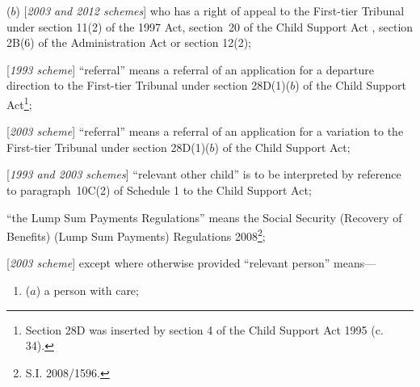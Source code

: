 \documentclass[12pt,a4paper]{article}
\begin{document}
\begin{enumerate}
\begin{enumerate}
($b$) [\emph{2003 and 2012 schemes}] who has a right of appeal to 
the First-tier Tribunal  %
under section 11(2) of the 1997 Act, section~20 of the Child Support Act%
, section 2B(6) of the Administration Act  %
or section 12(2);
\end{enumerate}


[\emph{1993 scheme}] “referral” means a referral of an application for a departure direction to 
the First-tier Tribunal  %
under section 28D(1)($b$) of the Child Support Act\footnote{\frenchspacing Section 28D was inserted by section 4 of the Child Support Act 1995 (c. 34).};

[\emph{2003 scheme}] “referral” means a referral of an application for a 
variation  %
to 
the First-tier Tribunal  %
under section 28D(1)($b$) of the Child Support Act;

[\emph{1993 and 2003 schemes}] “relevant other child” is to be interpreted by reference to paragraph~10C(2) of Schedule 1 to the Child Support Act;

“the Lump Sum Payments Regulations” means the Social Security (Recovery of Benefits) (Lump Sum Payments) Regulations 2008\footnote{S.I. 2008/1596.};

\begin{sloppypar}
[\emph{2003 scheme}] except where otherwise provided “relevant person” means—
\end{sloppypar}
\begin{enumerate}\item[]
    ($a$) 
    a person with care;


\end{enumerate}
\end{enumerate}
\end{document}
